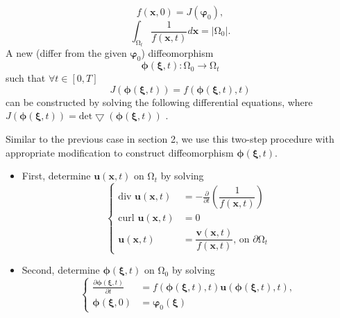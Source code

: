 \documentclass{article}
\theoremstyle{definition}
\theoremstyle{remark}
\numberwithin{equation}{section}
\numberwithin{subsection}{section}
\begin{document}
	\begin{equation}\label{GP1}
	f(\pmb{x},0)=J(\pmb{\varphi}_0),
	\end{equation}
	\begin{equation}
	\int_{\mathrm{\Omega}_t} \dfrac{1}{f(\pmb{x},t)}d\pmb{x} = |\mathrm{\Omega}_0|.
	\end{equation}
A new (differ from the given $\pmb{\varphi}_0$) diffeomorphism 
	\begin{equation}
	\pmb{\phi}(\pmb{\xi},t):\mathrm{\Omega}_0\rightarrow\mathrm{\Omega}_t
	\end{equation}
such that $\forall t \in [0,T]$
	\begin{equation}\label{GP4}
	J(\pmb{\phi}(\pmb{\xi},t)) = f(\pmb{\phi}(\pmb{\xi},t),t)
	\end{equation}
can be constructed by solving the following differential equations, where $J(\pmb{\phi}(\pmb{\xi},t)) = \text{det}\bigtriangledown(\pmb{\phi}(\pmb{\xi},t))$ .

Similar to the previous case in section 2, we use this two-step procedure with appropriate modification to construct diffeomorphism $\pmb{\phi}(\pmb{\xi},t)$.
	\begin{itemize}
	\item First, determine $\pmb{u}(\pmb{x},t)$ on $\mathrm{\Omega}_t$ by solving
	\begin{equation}
	\left\{
		\begin{aligned}
		\text{div } \pmb{u}(\pmb{x},t)& = -\frac{\partial}{\partial t}(\dfrac{1}{f(\pmb{x},t)}) \\
		\text{curl } \pmb{u}(\pmb{x},t)& = 0\\
		\pmb{u}(\pmb{x},t)& = \dfrac{\pmb{v}(\pmb{x},t)}{f(\pmb{x},t)} \text{, on } \partial\mathrm{\Omega}_t
		\end{aligned}\right.
	\end{equation}
	\item Second, determine $\pmb{\phi}(\pmb{\xi},t)$ on $\mathrm{\Omega}_0$ by solving	
		\begin{equation}
		\left\{
			\begin{aligned}
			\frac{\partial \pmb{\phi}(\pmb{\xi},t)}{\partial t}& = f(\pmb{\phi}(\pmb{\xi},t),t) \pmb{u}(\pmb{\phi}(\pmb{\xi},t),t), \\
			\pmb{\phi}(\pmb{\xi},0)& = \pmb{\varphi}_{0}(\pmb{\xi})
			\end{aligned}\right.
		\end{equation}
	\end{itemize}
\end{document}
